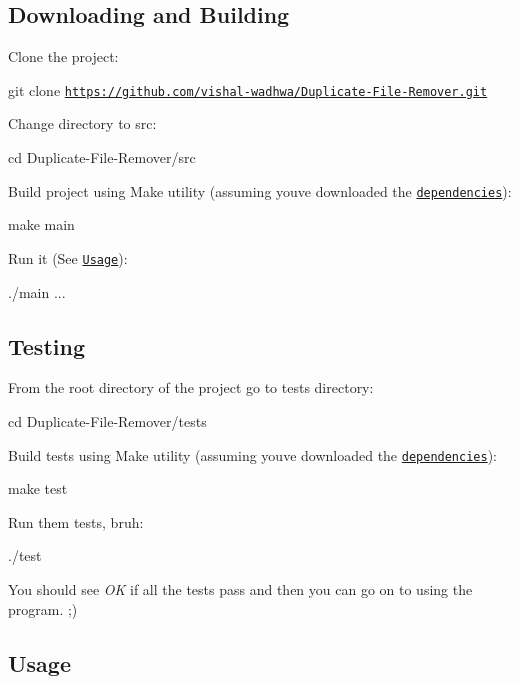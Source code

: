 \subsection*{Downloading and Building}


\begin{DoxyEnumerate}
\item Clone the project\+:

{\ttfamily git clone \href{https://github.com/vishal-wadhwa/Duplicate-File-Remover.git}{\tt https\+://github.\+com/vishal-\/wadhwa/\+Duplicate-\/\+File-\/\+Remover.\+git}}
\item Change directory to src\+:

{\ttfamily cd Duplicate-\/\+File-\/\+Remover/src}
\item Build project using Make utility (assuming you\textquotesingle{}ve downloaded the \href{#dep}{\tt dependencies})\+:

{\ttfamily make main}
\item Run it (See \href{#use}{\tt Usage})\+:

{\ttfamily ./main ...}
\end{DoxyEnumerate}

\subsection*{Testing}


\begin{DoxyEnumerate}
\item From the root directory of the project go to tests directory\+:

{\ttfamily cd Duplicate-\/\+File-\/\+Remover/tests}
\item Build tests using Make utility (assuming you\textquotesingle{}ve downloaded the \href{#dep}{\tt dependencies})\+:

{\ttfamily make test}
\item Run them tests, bruh\+:

{\ttfamily ./test}
\end{DoxyEnumerate}

You should see {\itshape OK} if all the tests pass and then you can go on to using the program. ;)

\subsection*{\label{_use}%
Usage}


